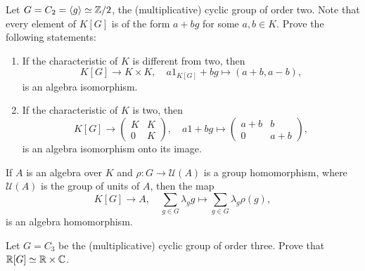 
\begin{exercise}
	Let $G=C_2=\langle g\rangle\simeq\mathbb{Z}/2$, the (multiplicative) cyclic group 
  of order two. Note that every element of $K[G]$ is of the form
	$a+bg$ for some $a,b\in K$. Prove the following statements:
	\begin{enumerate}
	    \item If the characteristic of $K$ is different from two, then 
	    \[
		K[G]\to K\times K,
		\quad
    a1_{K[G]}+bg\mapsto (a+b,a-b),
	\]
	is an algebra isomorphism. 
	\item If the characteristic of $K$ is two, then 
	\[
	K[G]\to \begin{pmatrix}
			K & K\\
			0 & K
		\end{pmatrix},
		\quad
		a1+bg\mapsto\begin{pmatrix}
			a+b & b\\
			0 & a+b
		\end{pmatrix},
	\]
	is an algebra isomorphism onto its image. 
	\end{enumerate}
\end{exercise}

If $A$ is an algebra over $K$ and $\rho\colon G\to \mathcal{U}(A)$
is a group homomorphism, where $\mathcal{U}(A)$ is the group of units of $A$, then 
the map \[
	K[G]\to A,\quad 
\sum_{g\in G}\lambda_gg\mapsto\sum_{g\in G}\lambda_g\rho(g),
\]
is an algebra homomorphism. 

\begin{exercise}
	Let $G=C_3$ be the (multiplicative) cyclic group of order three. Prove that
	$\mathbb{R}[G]\simeq\mathbb{R}\times\mathbb{C}$.
\end{exercise}

